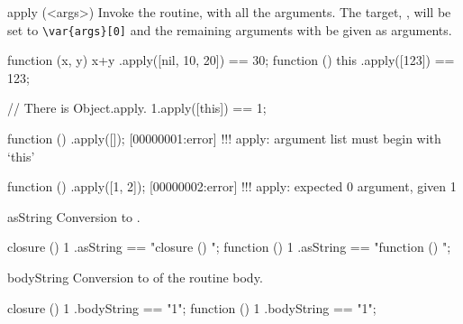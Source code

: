 \begin{urbiscriptapi}
\item[apply](<args>)%
  Invoke the routine, with all the arguments.  The target, \this, will be
  set to \lstinline|\var{args}[0]| and the remaining arguments with be given
  as arguments.
\begin{urbiassert}
function (x, y) { x+y }.apply([nil, 10, 20]) == 30;
function () { this }.apply([123]) == 123;

// There is Object.apply.
1.apply([this]) == 1;
\end{urbiassert}
\begin{urbiscript}
function () {}.apply([]);
[00000001:error] !!! apply: argument list must begin with `this'

function () {}.apply([1, 2]);
[00000002:error] !!! apply: expected 0 argument, given 1
\end{urbiscript}

\item[asString]
  Conversion to .
\begin{urbiassert}
closure  () { 1 }.asString == "closure () {\n}";
function () { 1 }.asString == "function () {\n}";
\end{urbiassert}

\item[bodyString]
  Conversion to  of the routine body.
\begin{urbiassert}
closure  () { 1 }.bodyString == "1";
function () { 1 }.bodyString == "1";
\end{urbiassert}

\end{urbiscriptapi}

